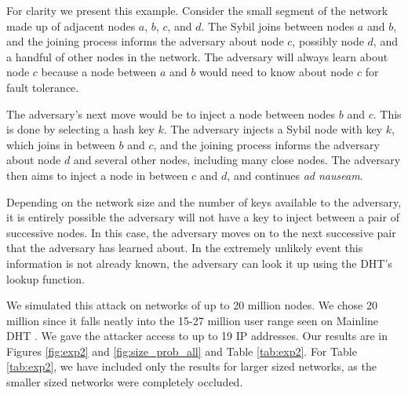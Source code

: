 For clarity we present this example. 
Consider the small segment of the network made up of adjacent nodes $a$, $b$, $c$, and $d$.
The Sybil joins between nodes $a$ and $b$, and the joining process informs the adversary about node $c$, possibly node $d$, and a handful of other nodes in the network.
The adversary will always learn about node $c$ because a node between $a$ and $b$ would need to know about node $c$ for fault tolerance.

The adversary's next move would be to inject a node between nodes $b$ and $c$.
This is done by selecting a hash key $k$.
The adversary injects a Sybil node with key $k$, which joins in between $b$ and $c$, and the joining process informs the adversary about node $d$ and several other nodes, including many close nodes.
The adversary then aims to inject a node in between $c$ and $d$, and continues \textit{ad nauseam}.  %

Depending on the network size and the number of keys available to the adversary, it is entirely possible the adversary will not have a key to inject between a pair of successive nodes.
In this case, the adversary moves on to the next successive pair that the adversary has learned about.
In the extremely unlikely event this information is not already known, the adversary can look it up using the DHT's lookup function.

We simulated this attack on networks of up to 20 million nodes.
We chose 20 million since it falls neatly into the 15-27 million user range seen on Mainline DHT \cite{mainlineMeasure}.
We gave the attacker access to up to 19 IP addresses.
Our results are in Figures \ref{fig:exp2} and \ref{fig:size_prob_all} and Table \ref{tab:exp2}.
For Table \ref{tab:exp2}, we have included only the results for larger sized networks, as the smaller sized networks were completely occluded.


